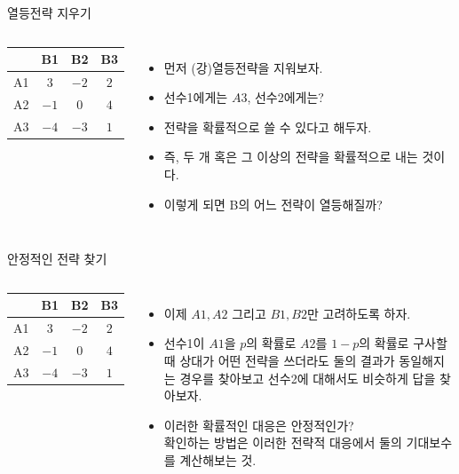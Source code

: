 \documentclass[final]{beamer}
\begin{document}
\begin{frame}[t]{열등전략 지우기}
	\begin{columns}
		\begin{center}
			\begin{table}
			\begin{tabular}{|c|c|c|c|} \hline
			& {B1} &  {B2} & {B3}\\ \hline
			{A1} & {$3$} & {$-2$} & {$2$} \\ \hline%
			{A2} & {$-1$} & {$0$} & {$4$} \\ \hline
			{A3} & {$-4$}  & {$-3$} & {$1$} \\ \hline
			\end{tabular}
			\end{table}
		\end{center}
		\begin{itemize}
			\item 먼저 (강)열등전략을 지워보자. 
			\item 선수1에게는 $A3$,  선수2에게는?
			\item 전략을 확률적으로 쓸 수 있다고 해두자. 
			\item 즉, 두 개 혹은 그 이상의 전략을 확률적으로 내는 것이다. 
			\item 이렇게 되면 B의 어느 전략이 열등해질까?
		\end{itemize}
	\end{columns}
\end{frame}

\begin{frame}[t]{안정적인 전략 찾기}
	\begin{columns}
		\column{.4\textwidth}
		\begin{center}
			\begin{table}
			\begin{tabular}{|c|c|c|c|} \hline
			& {B1} &  {B2} & {B3}\\ \hline
			{A1} & {$3$} & {$-2$} & {$2$} \\ \hline%
			{A2} & {$-1$} & {$0$} & {$4$} \\ \hline
			{A3} & {$-4$}  & {$-3$} & {$1$} \\ \hline
			\end{tabular}
			\end{table}
		\end{center}
		\column{.6\textwidth}
		\begin{itemize}
			\item 이제 $A1, A2$ 그리고 $B1, B2$만 고려하도록 하자. 
			\item 선수1이 $A1$을 $p$의 확률로 $A2$를 $1-p$의 확률로 구사할 때 상대가 어떤 전략을 쓰더라도 둘의 결과가 동일해지는 경우를 찾아보고 선수2에 대해서도 비슷하게 답을 찾아보자. 
			\item 이러한 확률적인 대응은 안정적인가? 
			\\ 확인하는 방법은 이러한 전략적 대응에서 둘의 기대보수를 계산해보는 것.
		\end{itemize}
	\end{columns}
\end{frame}
\end{document}
